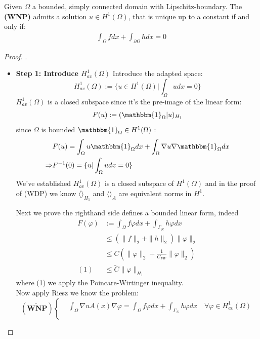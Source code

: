 \begin{theorem}
	Given $\Omega$ a bounded, simply connected domain with Lipschitz-boundary. The \textbf{(WNP)} admits a solution $u \in H^1(\Omega)$,  that is unique up to a constant if and only if:
	\begin{align*}
		\int_\Omega fdx + \int_{\partial \Omega} hdx = 0
	\end{align*}
\end{theorem}
\begin{proof}.
\begin{itemize}
\item \textbf{Step 1: Introduce $H^1_{av}(\Omega)$} 
Introduce the adapted space:
\begin{equation}
	H^1_{av}(\Omega) := \{ u \in H^1(\Omega)| \int_\Omega u dx = 0\}
\end{equation}
$H^1_{av}(\Omega)$ is a closed subspace since it's the pre-image of the linear form:
\begin{align*}
	F(u):= ( \mathbbm{1}_{\Omega}| u )_{H_1}
\end{align*}
since $\Omega$ is bounded $\mathbbm{1}_{\Omega} \in H^1(\Omega)$ :
\begin{align*}
	&F(u) = \int_\Omega u \mathbbm{1}_{\Omega} dx + \int_\Omega \nabla u  \nabla \mathbbm{1}_{\Omega} dx \\
	\Rightarrow &F^{-1}(0) = \{u |\int_\Omega u dx = 0 \}
\end{align*}
We've established $H_{av}^1(\Omega)$ is a closed subspace of $H^1(\Omega)$ and in the proof of (WDP) we know $\langle \rangle_{H_1}$ and $\langle \rangle_{A}$ are equivalent norms in $H^1$.\par
Next we prove the righthand side defines a bounded linear form, indeed
\begin{align*}
	F(\varphi)&:= \int_\Omega f\varphi dx + \int_{\Gamma_N} h\varphi dx\\
	&\leq (\|f\|_2 + \|h\|_2) \|\varphi\|_2 \\
	&\leq C(\|\varphi\|_2 + \frac{1}{C_{PW}}\|\varphi\|_2)\\
 (1)&\leq \tilde{C} \|\varphi\|_{H_1}
\end{align*}
where (1) we apply the Poincare-Wirtinger inequality.\\
Now apply Riesz we know the problem:
\begin{equation*}
(\tilde{\textbf{WNP}})\left\{
\begin{aligned}
	&\int_\Omega \nabla u A(x) \nabla \varphi = \int_\Omega f\varphi dx + \int_{\Gamma_N} h\varphi dx \quad \forall \varphi \in H^1_{av}(\Omega)\\

\end{aligned}
\end{equation*}
\end{itemize}
\end{proof}
